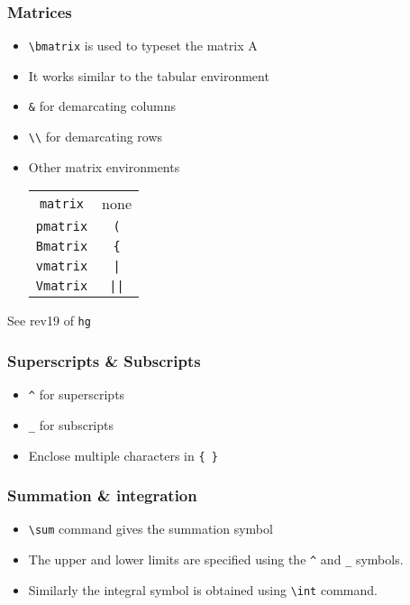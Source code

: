 \documentclass{beamer}
\newcommand{\typ}[1]{\lstinline{#1}}
\begin{document}
\begin{frame}[fragile]
  \frametitle{Matrices}
  \begin{itemize}
  \item \lstinline+\bmatrix+ is used to typeset the matrix A
  \item It works similar to the tabular environment
  \item \lstinline+&+ for demarcating columns
  \item \lstinline+\\+ for demarcating rows
  \item Other matrix environments
  \begin{table}
    \center
    \begin{tabular}{c|c}
      \lstinline+matrix+  &  none\\
      \lstinline+pmatrix+ &  \lstinline+(+\\
      \lstinline+Bmatrix+ &  \lstinline+{+\\
        \lstinline+vmatrix+ &  \lstinline+|+\\  
        \lstinline+Vmatrix+ &  \lstinline+||+
    \end{tabular}
  \end{table}
  \end{itemize}
  \tiny See rev19 of \typ{hg}    
\end{frame}

\begin{frame}[fragile]
  \frametitle{Superscripts \& Subscripts}
  \begin{itemize}
  \item \lstinline+^+ for superscripts
  \item \lstinline+_+ for subscripts
  \item Enclose multiple characters in \lstinline+{ }+
  \end{itemize}
\end{frame}

\begin{frame}[fragile]
  \frametitle{Summation \& integration}
  \begin{itemize}
  \item \lstinline+\sum+ command gives the summation symbol
  \item The upper and lower limits are specified using the
    \lstinline+^+ and \lstinline+_+ symbols. 
  \item Similarly the integral symbol is obtained using
    \lstinline+\int+ command. 
  \end{itemize}
\end{frame}
\end{document}
